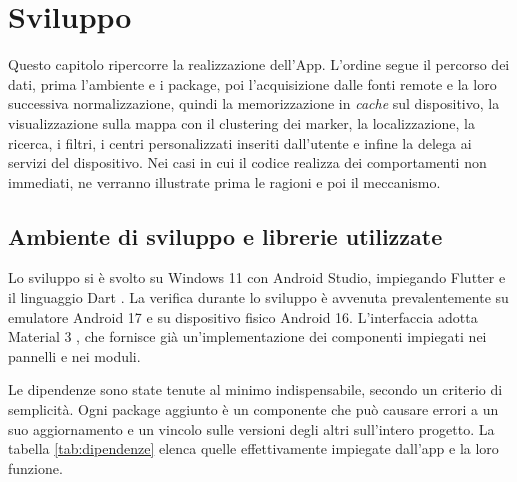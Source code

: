 \chapter{Sviluppo}\label{ch:sviluppo}

Questo capitolo ripercorre la realizzazione dell'App.
L'ordine segue il percorso dei dati, prima l'ambiente e i package, poi l'acquisizione dalle fonti remote e la loro
successiva normalizzazione, quindi la memorizzazione in \textit{cache} sul dispositivo, la visualizzazione sulla mappa con il
clustering dei marker, la localizzazione, la ricerca, i filtri, i centri personalizzati inseriti dall'utente e infine
la delega ai servizi del dispositivo.
Nei casi in cui il codice realizza dei comportamenti non immediati, ne verranno illustrate prima le ragioni e poi il meccanismo.

\section{Ambiente di sviluppo e librerie utilizzate}\label{sec:ambiente-sviluppo}

Lo sviluppo si è svolto su Windows 11 con Android Studio, impiegando Flutter e il linguaggio Dart \cite{flutterDocs, dartLang}.
La verifica durante lo sviluppo è avvenuta prevalentemente su emulatore Android 17 e su dispositivo fisico Android 16. %
L'interfaccia adotta Material 3 \cite{material3}, che fornisce già un'implementazione dei componenti impiegati nei pannelli e nei moduli.

Le dipendenze sono state tenute al minimo indispensabile, secondo un criterio di semplicità.
Ogni package aggiunto è un componente che può causare errori a un suo aggiornamento e un vincolo sulle versioni degli altri
sull'intero progetto.
La tabella \ref{tab:dipendenze} elenca quelle effettivamente impiegate dall'app e la loro funzione.


